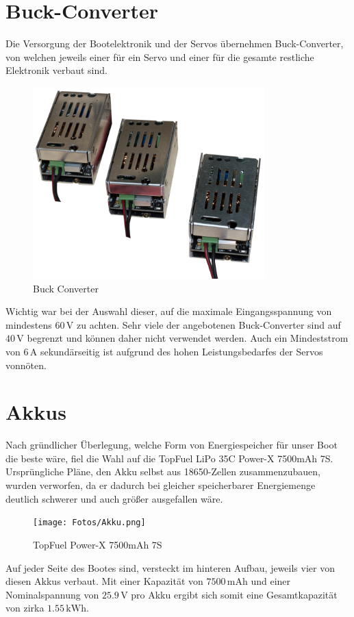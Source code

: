 \section{Buck-Converter}
Die Versorgung der Bootelektronik und der Servos übernehmen Buck-Converter, von welchen jeweils einer für ein Servo und einer für die gesamte restliche Elektronik verbaut sind.
\begin{figure}[h]
    \centering
    \includegraphics[width=0.8\textwidth]{Fotos/Buck_Converter.png}
    \caption{Buck Converter}
\end{figure}
Wichtig war bei der Auswahl dieser, auf die maximale Eingangsspannung von mindestens $60\,\mathrm{V}$ zu achten. Sehr viele der angebotenen Buck-Converter sind auf $40\,\mathrm{V}$ begrenzt und können daher nicht verwendet werden.
Auch ein Mindeststrom von $6\,\mathrm{A}$ sekundärseitig ist aufgrund des hohen Leistungsbedarfes der Servos vonnöten. 
\newpage

\section{Akkus \label{sec:Akkus}}
Nach gründlicher Überlegung, welche Form von Energiespeicher für unser Boot die beste wäre, fiel die Wahl auf die TopFuel LiPo 35C Power-X 7500mAh 7S.
Ursprüngliche Pläne, den Akku selbst aus 18650-Zellen zusammenzubauen, wurden verworfen, da er dadurch bei gleicher speicherbarer Energiemenge deutlich schwerer und auch größer ausgefallen wäre.
\begin{figure}[h]
    \centering
    \texttt{[image: Fotos/Akku.png]}
    \caption{TopFuel Power-X 7500mAh 7S}
\end{figure}

Auf jeder Seite des Bootes sind, versteckt im hinteren Aufbau, jeweils vier von diesen Akkus verbaut. Mit einer Kapazität von $7500\,\textrm{mAh}$ und einer Nominalspannung von $25.9\,\mathrm{V}$ pro Akku ergibt sich somit eine Gesamtkapazität von zirka $1.55\,\mathrm{kWh}$.

\newpage